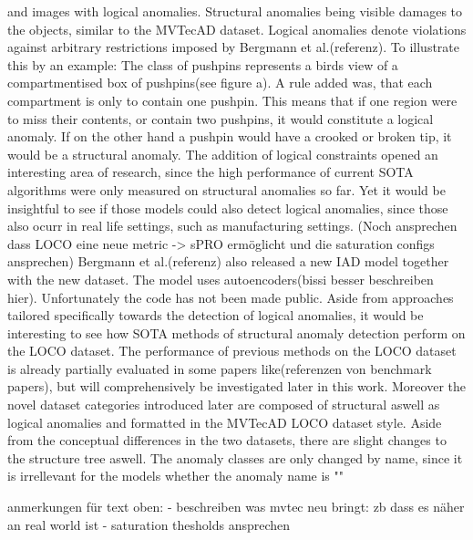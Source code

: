 and images with logical anomalies. Structural anomalies being visible damages to the objects, similar to the MVTecAD dataset. Logical anomalies denote violations against arbitrary restrictions 
imposed by Bergmann et al.(referenz). To illustrate this by an example: The class of pushpins represents a birds view of a compartmentised box of pushpins(see figure a). A rule added was, 
that each compartment is only to contain one pushpin. This means that if one region were to miss their contents, or contain two pushpins, it would constitute a logical anomaly. If on the 
other hand a pushpin would have a crooked or broken tip, it would be a structural anomaly. The addition of logical constraints opened an interesting area of research, since the high performance 
of current SOTA algorithms were only measured on structural anomalies so far. Yet it would be insightful to see if those models could also detect logical anomalies, since those also ocurr 
in real life settings, such as manufacturing settings. (Noch ansprechen dass LOCO eine neue metric -> sPRO ermöglicht und die saturation configs ansprechen)
Bergmann et al.(referenz) also released a new IAD model together with the new dataset. The model uses autoencoders(bissi besser beschreiben hier). Unfortunately the code has not been made public. 
Aside from approaches tailored specifically towards the detection of logical anomalies, it would be interesting to see how SOTA methods of structural anomaly detection perform on the LOCO dataset. 
The performance of previous methods on the LOCO dataset is already partially evaluated in some papers like(referenzen von benchmark papers), but will comprehensively be investigated later in this work.
Moreover the novel dataset categories introduced later are composed of structural aswell as logical anomalies and formatted in the MVTecAD LOCO dataset style.
Aside from the conceptual differences in the two datasets, there are slight changes to the structure tree aswell. The anomaly classes are only changed by name, since it is irrellevant for 
the models whether the anomaly name is ""




anmerkungen für text oben:
- beschreiben was mvtec neu bringt: zb dass es näher an real world ist
- saturation thesholds ansprechen



